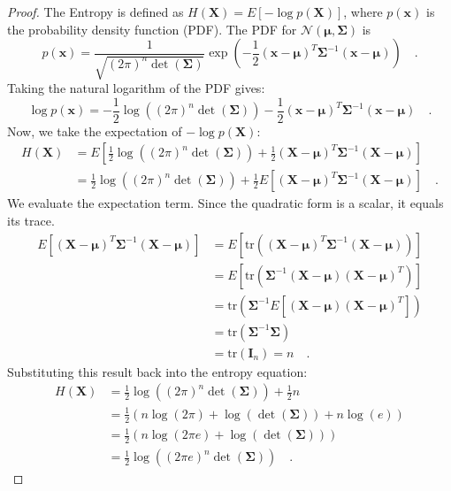 \documentclass[../../main.tex]{subfiles}
\begin{document}
\begin{proof}
    The Entropy is defined as $H(\bm{X}) = E[-\log p(\bm{X})]$, where $p(\bm{x})$ is the probability density function (PDF). The PDF for $\mathcal{N}(\bm{\mu}, \bm{\Sigma})$ is
    \[
        p(\bm{x}) = \frac{1}{\sqrt{(2\pi)^n \det(\bm{\Sigma})}} \exp\left(-\frac{1}{2}(\bm{x}-\bm{\mu})^T \bm{\Sigma}^{-1} (\bm{x}-\bm{\mu})\right) \quad.
    \]
    Taking the natural logarithm of the PDF gives:
    \[
        \log p(\bm{x}) = -\frac{1}{2}\log\left((2\pi)^n \det(\bm{\Sigma})\right) - \frac{1}{2}(\bm{x}-\bm{\mu})^T \bm{\Sigma}^{-1} (\bm{x}-\bm{\mu}) \quad.
    \]
    Now, we take the expectation of $-\log p(\bm{X})$:
    \begin{align*}
        H(\bm{X}) &= E\left[ \frac{1}{2}\log\left((2\pi)^n \det(\bm{\Sigma})\right) + \frac{1}{2}(\bm{X}-\bm{\mu})^T \bm{\Sigma}^{-1} (\bm{X}-\bm{\mu}) \right] \\
        &= \frac{1}{2}\log\left((2\pi)^n \det(\bm{\Sigma})\right) + \frac{1}{2}E\left[(\bm{X}-\bm{\mu})^T \bm{\Sigma}^{-1} (\bm{X}-\bm{\mu})\right] \quad.
    \end{align*}
    We evaluate the expectation term. Since the quadratic form is a scalar, it equals its trace.
    \begin{align*}
        E\left[(\bm{X}-\bm{\mu})^T \bm{\Sigma}^{-1} (\bm{X}-\bm{\mu})\right] &= E\left[\text{tr}\left((\bm{X}-\bm{\mu})^T \bm{\Sigma}^{-1} (\bm{X}-\bm{\mu})\right)\right] \\
        &= E\left[\text{tr}\left(\bm{\Sigma}^{-1} (\bm{X}-\bm{\mu})(\bm{X}-\bm{\mu})^T\right)\right] \\
        &= \text{tr}\left(\bm{\Sigma}^{-1} E\left[(\bm{X}-\bm{\mu})(\bm{X}-\bm{\mu})^T\right]\right) \\
        &= \text{tr}\left(\bm{\Sigma}^{-1} \bm{\Sigma}\right) \\
        &= \text{tr}(\mathbf{I}_n) = n \quad.
    \end{align*}
    Substituting this result back into the entropy equation:
    \begin{align*}
        H(\bm{X}) &= \frac{1}{2}\log\left((2\pi)^n \det(\bm{\Sigma})\right) + \frac{1}{2}n \\
        &= \frac{1}{2} \left( n \log(2\pi) + \log(\det(\bm{\Sigma})) + n\log(e) \right) \\
        &= \frac{1}{2} \left( n \log(2\pi e) + \log(\det(\bm{\Sigma})) \right) \\
        &= \frac{1}{2} \log\left( (2\pi e)^n \det(\bm{\Sigma}) \right) \quad.
    \end{align*}
\end{proof}
\end{document}
